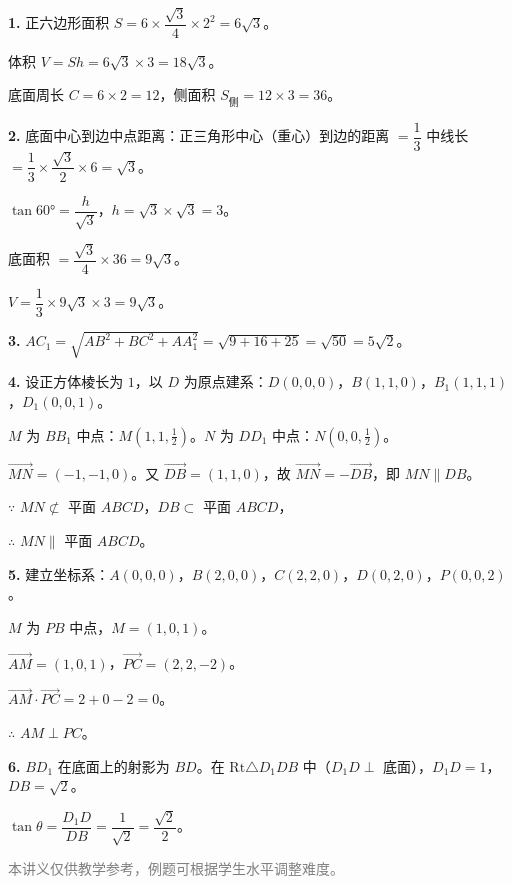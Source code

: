 \documentclass[12pt, a4paper]{ctexart}
\begin{document}
\vspace{10pt}
\begin{knowledgebox}[参考答案]

\textbf{1.} 正六边形面积 $S = 6 \times \dfrac{\sqrt{3}}{4} \times 2^2 = 6\sqrt{3}$。

体积 $V = Sh = 6\sqrt{3} \times 3 = 18\sqrt{3}$。

底面周长 $C = 6 \times 2 = 12$，侧面积 $S_{\text{侧}} = 12 \times 3 = 36$。

\medskip

\textbf{2.} 底面中心到边中点距离：正三角形中心（重心）到边的距离 $= \dfrac{1}{3}$ 中线长 $= \dfrac{1}{3} \times \dfrac{\sqrt{3}}{2} \times 6 = \sqrt{3}$。

$\tan 60° = \dfrac{h}{\sqrt{3}}$，$h = \sqrt{3} \times \sqrt{3} = 3$。

底面积 $= \dfrac{\sqrt{3}}{4} \times 36 = 9\sqrt{3}$。

$V = \dfrac{1}{3} \times 9\sqrt{3} \times 3 = 9\sqrt{3}$。

\medskip

\textbf{3.} $AC_1 = \sqrt{AB^2 + BC^2 + AA_1^2} = \sqrt{9 + 16 + 25} = \sqrt{50} = 5\sqrt{2}$。

\medskip

\textbf{4.} 设正方体棱长为 $1$，以 $D$ 为原点建系：$D(0,0,0)$，$B(1,1,0)$，$B_1(1,1,1)$，$D_1(0,0,1)$。

$M$ 为 $BB_1$ 中点：$M(1,1,\frac{1}{2})$。$N$ 为 $DD_1$ 中点：$N(0,0,\frac{1}{2})$。

$\vec{MN} = (-1,-1,0)$。又 $\vec{DB} = (1,1,0)$，故 $\vec{MN} = -\vec{DB}$，即 $MN \parallel DB$。

$\because$ $MN \not\subset$ 平面 $ABCD$，$DB \subset$ 平面 $ABCD$，

$\therefore$ $MN \parallel$ 平面 $ABCD$。

\medskip

\textbf{5.} 建立坐标系：$A(0,0,0)$，$B(2,0,0)$，$C(2,2,0)$，$D(0,2,0)$，$P(0,0,2)$。

$M$ 为 $PB$ 中点，$M = (1,0,1)$。

$\vec{AM} = (1,0,1)$，$\vec{PC} = (2,2,-2)$。

$\vec{AM} \cdot \vec{PC} = 2 + 0 - 2 = 0$。

$\therefore$ $AM \perp PC$。

\medskip

\textbf{6.} $BD_1$ 在底面上的射影为 $BD$。在 $\mathrm{Rt}\triangle D_1DB$ 中（$D_1D \perp$ 底面），$D_1D = 1$，$DB = \sqrt{2}$。

$\tan \theta = \dfrac{D_1D}{DB} = \dfrac{1}{\sqrt{2}} = \dfrac{\sqrt{2}}{2}$。

\end{knowledgebox}

\vfill
\begin{center}
\small\textcolor{gray}{本讲义仅供教学参考，例题可根据学生水平调整难度。}
\end{center}
\end{document}
